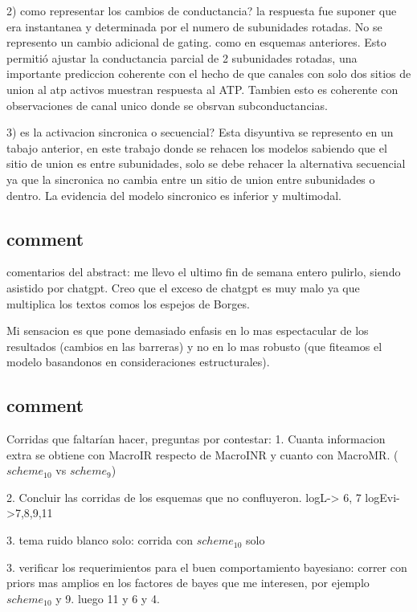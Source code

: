 \documentclass[a4paper,12pt]{article}
\begin{document}
		2) como representar los cambios de conductancia? la respuesta fue suponer que era instantanea y determinada por el numero de subunidades rotadas. No se represento un cambio adicional de gating. como en esquemas anteriores. Esto permitió ajustar la conductancia parcial de 2 subunidades rotadas, una importante prediccion coherente con el hecho de que canales con solo dos sitios de union al atp activos muestran respuesta al ATP. Tambien esto es coherente con observaciones de canal unico donde se obsrvan subconductancias. 
		
		3) es la activacion sincronica o secuencial? Esta disyuntiva se represento en un tabajo anterior, en este trabajo donde se rehacen los modelos sabiendo que el sitio de union es entre subunidades, solo se debe rehacer la alternativa secuencial ya que la sincronica no cambia entre un sitio de union entre subunidades o dentro. La evidencia del modelo sincronico es inferior y multimodal.
	
	
	
	\subsection{comment}
		comentarios del abstract: 
		me llevo el ultimo fin de semana entero pulirlo, siendo asistido por chatgpt. 
		Creo que el exceso de chatgpt es muy malo ya que multiplica los textos comos los espejos de Borges. 
		
		Mi sensacion es que pone demasiado enfasis en lo mas espectacular de los resultados (cambios en las barreras) y no en lo mas robusto (que fiteamos el modelo basandonos en consideraciones estructurales).
		
	
	
	\subsection{comment}
		Corridas que faltarían hacer, preguntas por contestar: 
		1. Cuanta informacion extra se obtiene con MacroIR respecto de MacroINR y cuanto con MacroMR. ($scheme_10$ vs $scheme_9$)
		
		2. Concluir las corridas de los esquemas que no confluyeron. 
		logL-> 6, 7
		logEvi->7,8,9,11
		
		3. tema ruido blanco solo: corrida con $scheme_10$ solo
		
		
		
		3. verificar los requerimientos para el buen comportamiento bayesiano: correr con priors mas amplios en los factores de bayes que me interesen, por ejemplo $scheme_10$ y 9. 
		luego 11 y 6 y 4. 
		
\end{document}
